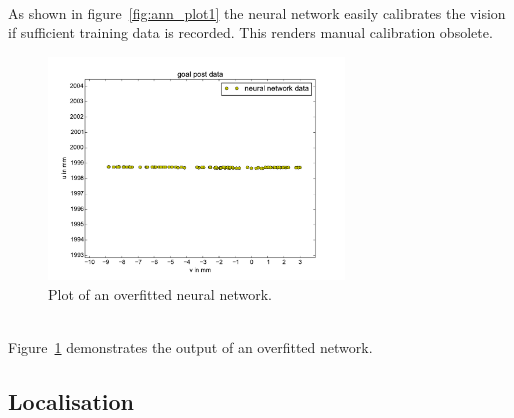\documentclass[lnicst,a4paper]{svmultln}
\begin{document}
\\
As shown in figure~\ref{fig:ann_plot1} the neural network easily calibrates the vision if sufficient training data is recorded. This renders manual calibration obsolete.
\\
\begin{figure}
 	\centerline{\includegraphics[width=0.7\textwidth]{ann_plot2.pdf}}
	{\caption{Plot of an overfitted neural network.}\label{fig:ann_plot2}}
\end{figure}
\\
Figure~\ref{fig:ann_plot2} demonstrates the output of an overfitted network.





\subsection{Localisation}
\label{sec:solutions_localisation}
\end{document}
